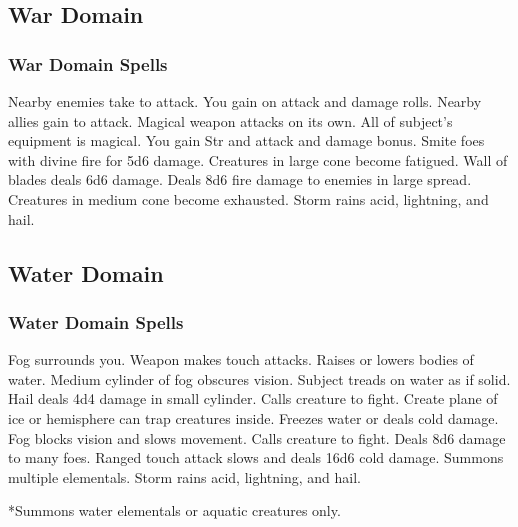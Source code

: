 \subsection{War Domain}
\subsubsection{War Domain Spells}
\begin{spelllist}
   Nearby enemies take  to attack.
   You gain  on attack and damage rolls.
   Nearby allies gain  to attack.
   Magical weapon attacks on its own.
  \spellhead[3]{}
  \spellhead[3]{}
   All of subject's equipment is magical.
   You gain  Str and attack and damage bonus.
   Smite foes with divine fire for 5d6 damage.
   Creatures in large cone become fatigued.
   Wall of blades deals 6d6 damage.
  \spellhead[6]{}
  \spellhead[7]{}
  \spellhead[7]{}
   Deals 8d6 fire damage to enemies in large spread.
   Creatures in medium cone become exhausted.  
  \spellhead[9]{}
   Storm rains acid, lightning, and hail.
\end{spelllist}

\subsection{Water Domain}
\subsubsection{Water Domain Spells}
\begin{spelllist}
   Fog surrounds you.
  \spellhead[1]{}
   Weapon makes touch attacks. 
   Raises or lowers bodies of water.
   Medium cylinder of fog obscures vision.
   Subject treads on water as if solid.
   Hail deals 4d4 damage in small cylinder.
   Calls creature to fight.
  \spellhead[5]{}
   Create plane of ice or hemisphere can trap creatures inside.
   Freezes water or deals cold damage.
   Fog blocks vision and slows movement.
  \spellhead[7]{}
   Calls creature to fight.
   Deals 8d6 damage to many foes.
   Ranged touch attack slows and deals 16d6 cold damage.
   Summons multiple elementals.
   Storm rains acid, lightning, and hail.
\end{spelllist}
*Summons water elementals or aquatic creatures only.


